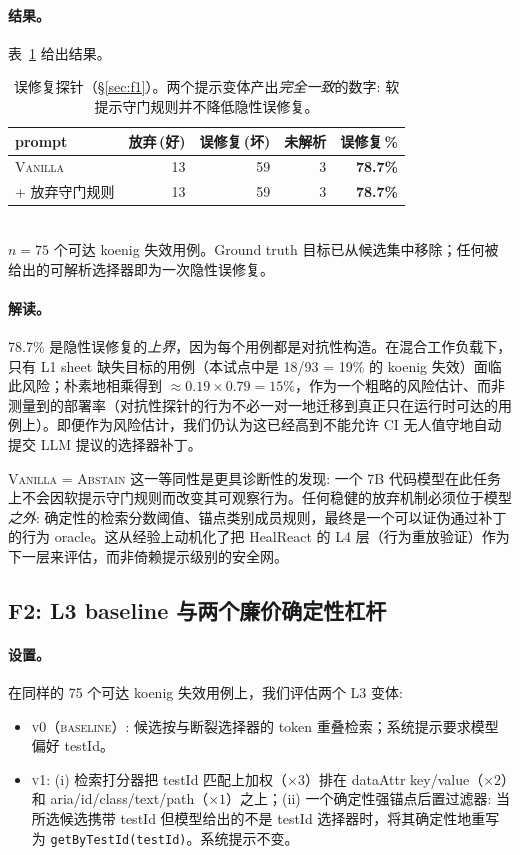 \paragraph{结果。}
表~\ref{tab:falseheal} 给出结果。

\begin{table}[t]
\centering
\caption{误修复探针（\S\ref{sec:f1}）。两个提示变体产出\emph{完全一致}的数字: 软提示守门规则并不降低隐性误修复。}
\label{tab:falseheal}
\small
\begin{tabular}{lrrrr}
\toprule
prompt & 放弃\,(好) & 误修复\,(坏) & 未解析 & \textbf{误修复\,\%} \\
\midrule
\textsc{Vanilla} & 13 & 59 & 3 & \textbf{78.7\%} \\
\textsc{+ 放弃守门规则} & 13 & 59 & 3 & \textbf{78.7\%} \\
\bottomrule
\end{tabular}
\\[2pt]
{\scriptsize $n=75$ 个可达 koenig 失效用例。Ground truth 目标已从候选集中移除；任何被给出的可解析选择器即为一次隐性误修复。}
\end{table}

\paragraph{解读。}
78.7\% 是隐性误修复的\emph{上界}，因为每个用例都是对抗性构造。在混合工作负载下，只有 L1 sheet 缺失目标的用例（本试点中是 18/93 = 19\% 的 koenig 失效）面临此风险；朴素地相乘得到 $\approx 0.19 \times 0.79 = 15\%$，作为一个粗略的风险估计、而非测量到的部署率（对抗性探针的行为不必一对一地迁移到真正只在运行时可达的用例上）。即便作为风险估计，我们仍认为这已经高到不能允许 CI 无人值守地自动提交 LLM 提议的选择器补丁。

\textsc{Vanilla = Abstain} 这一等同性是更具诊断性的发现: 一个 7B 代码模型在此任务上不会因软提示守门规则而改变其可观察行为。任何稳健的放弃机制必须位于模型\emph{之外}: 确定性的检索分数阈值、锚点类别成员规则，最终是一个可以证伪通过补丁的行为 oracle。这从经验上动机化了把 HealReact 的 L4 层（行为重放验证）作为下一层来评估，而非倚赖提示级别的安全网。

\subsection{F2: L3 baseline 与两个廉价确定性杠杆}
\label{sec:f2}

\paragraph{设置。}
在同样的 75 个可达 koenig 失效用例上，我们评估两个 L3 变体:
\begin{itemize}
\item \textsc{v0（baseline）}: 候选按与断裂选择器的 token 重叠检索；系统提示要求模型偏好 testId。
\item \textsc{v1}: (i) 检索打分器把 testId 匹配上加权（$\times 3$）排在 dataAttr key/value（$\times 2$）和 aria/id/class/text/path（$\times 1$）之上；(ii) 一个确定性强锚点后置过滤器: 当所选候选携带 testId 但模型给出的不是 testId 选择器时，将其确定性地重写为 \texttt{getByTestId(testId)}。系统提示不变。
\end{itemize}

